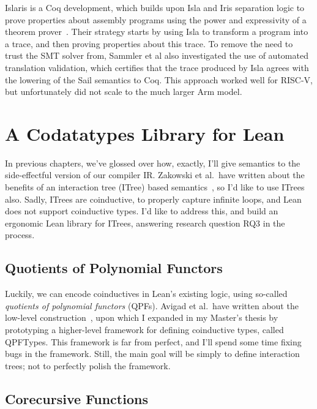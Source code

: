 \documentclass[a4paper]{scrartcl}
\begin{document}
Islaris is a Coq development, which builds upon Isla and Iris separation logic to 
prove properties about assembly programs using the power and expressivity of a 
theorem prover~\cite{sammlerIslarisVerificationMachine2022}. Their strategy starts by using Isla to transform a program into a trace, and then proving properties about this trace.
To remove the need to trust the SMT solver from, Sammler et al also investigated
the use of automated translation validation, which certifies that the trace produced
by Isla agrees with the lowering of the Sail semantics to Coq. This approach 
worked well for RISC-V, but unfortunately did not scale to the much larger Arm model.


\section{A Codatatypes Library for
Lean}\label{a-codatatypes-library-for-lean}

In previous chapters, we've glossed over how, exactly, I'll give
semantics to the side-effectful version of our compiler IR. Zakowski et
al.~have written about the benefits of an interaction tree (ITree)
based semantics~\cite{zakowskiModularCompositionalExecutable2021, xiaInteractionTreesRepresenting2020}, so I'd like to use
ITrees also. Sadly, ITrees are coinductive, to properly capture infinite loops, 
and Lean does not support coinductive types. 
I'd like to address this, and build an ergonomic Lean library for ITrees,
answering research question \textsc{RQ3} in the process.

\subsection{Quotients of Polynomial
Functors}\label{quotients-of-polynomial-functors}

Luckily, we can encode coinductives in Lean's existing logic, using
so-called \emph{quotients of polynomial functors} (QPFs). Avigad et
al.~have written about the low-level construction~\cite{avigadDataTypesQuotients2019}, 
upon which I expanded in my Master's thesis by prototyping a higher-level framework for defining
coinductive types, called QPFTypes. This framework is far from perfect,
and I'll spend some time fixing bugs in the framework. Still, the main
goal will be simply to define interaction trees; not to perfectly polish
the framework.

\subsection{Corecursive Functions}\label{corecursive-functions}
\end{document}
